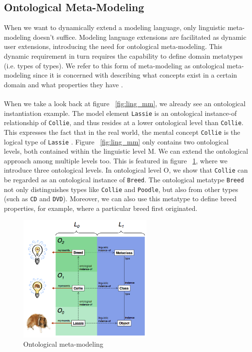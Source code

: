\subsection{Ontological Meta-Modeling}

When we want to dynamically extend a modeling language, only linguistic meta-modeling doesn't suffice. Modeling language extensions are facilitated as dynamic user extensions, introducing the need for ontological meta-modeling. This dynamic requirement in turn requires the capability to define domain metatypes (i.e. types of types). We refer to this form of meta-modeling as ontological meta-modeling since it is concerned with describing what concepts exist in a certain domain and what properties they have \cite{MDDFound}. \\ \\
When we take a look back at figure ~\ref{fig:ling_mm}, we already see an ontological instantiation example. The model element \texttt{Lassie} is an ontological instance-of relationship of \texttt{Collie}, and thus resides at a lower ontological level than \texttt{Collie}. This expresses the fact that in the real world, the mental concept \texttt{Collie} is the logical type of \texttt{Lassie} \cite{MDDFound}. Figure ~\ref{fig:ling_mm} only contains two ontological levels, both contained within the linguistic level M. We can extend the ontological approach among multiple levels too. This is featured in figure ~\ref{fig:ont_mm}, where we introduce three ontological levels. In ontological level O, we show that \texttt{Collie} can be regarded as an ontological instance of \texttt{Breed}. The ontological metatype \texttt{Breed} not only distinguishes types like \texttt{Collie} and \texttt{Poodle}, but also from other types (such as \texttt{CD} and \texttt{DVD}). Moreover, we can also use this metatype to define breed properties, for example, where a particular breed first originated.
\begin{figure}[h!]
\centering
\includegraphics[width=0.6\textwidth]{images/chap2_ontological_mm.png}
\caption{Ontological meta-modeling \cite{MDDFound}}
\label{fig:ont_mm}
\end{figure}
\newpage

